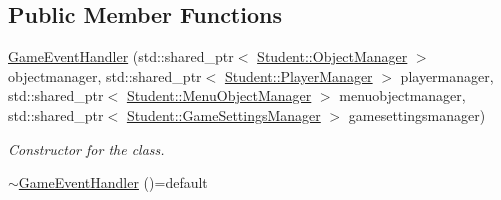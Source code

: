 \subsection*{Public Member Functions}
\begin{DoxyCompactItemize}
\item 
\hyperlink{class_student_1_1_game_event_handler_aca6fae1c13215032811f273301e5aaeb}{Game\-Event\-Handler} (std\-::shared\-\_\-ptr$<$ \hyperlink{class_student_1_1_object_manager}{Student\-::\-Object\-Manager} $>$ objectmanager, std\-::shared\-\_\-ptr$<$ \hyperlink{class_student_1_1_player_manager}{Student\-::\-Player\-Manager} $>$ playermanager, std\-::shared\-\_\-ptr$<$ \hyperlink{class_student_1_1_menu_object_manager}{Student\-::\-Menu\-Object\-Manager} $>$ menuobjectmanager, std\-::shared\-\_\-ptr$<$ \hyperlink{class_student_1_1_game_settings_manager}{Student\-::\-Game\-Settings\-Manager} $>$ gamesettingsmanager)
\begin{DoxyCompactList}\small\item\em Constructor for the class. \end{DoxyCompactList}\item 
\hypertarget{class_student_1_1_game_event_handler_ac999a823c49c069000a660d0ae977afc}{\hyperlink{class_student_1_1_game_event_handler_ac999a823c49c069000a660d0ae977afc}{$\sim$\-Game\-Event\-Handler} ()=default}\label{class_student_1_1_game_event_handler_ac999a823c49c069000a660d0ae977afc}


\end{DoxyCompactItemize}
